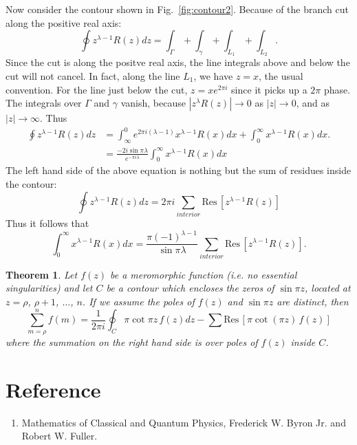 \documentclass[11pt, letterpaper]{article}
\newtheorem{thm}{Theorem}
\begin{document}
Now consider the contour shown in Fig.~\ref{fig:contour2}. Because of the branch cut along the positive real axis:
\begin{equation}
	\oint z^{\lambda-1}R(z)dz = \int_\Gamma + \int_\gamma + \int_{L_1} + \int_{L_2}.
\end{equation}
Since the cut is along the positve real axis, the line integrals above and below the cut will not cancel. In fact, 
along the line $L_1$, we have $z=x$, the usual convention. For the line just below the cut, $z = x e^{2\pi i}$
since it picks up a $2\pi$ phase. The integrals over $\Gamma$ and $\gamma$ vanish, because
$|z^\lambda R(z)|\rightarrow 0$ as $|z|\rightarrow 0$, and as $|z|\rightarrow \infty$. Thus
\begin{align}
	\oint z^{\lambda-1}R(z)dz 
		&= \int_\infty^0 e^{2\pi i (\lambda-1)}x^{\lambda-1}R(x)dx + \int_0^\infty x^{\lambda-1}R(x)dx. \nonumber\\
		&= \frac{-2i\sin\pi\lambda}{e^{-\pi i\lambda}}\int_0^\infty x^{\lambda-1}R(x)dx
\end{align}
The left hand side of the above equation is nothing but the sum of residues inside the contour:
\begin{equation}
	\oint z^{\lambda-1} R(z)dz = 2\pi i\sum_{interior} \mbox{Res}\,\left[z^{\lambda-1}R(z)\right]
\end{equation}
Thus it follows that
\begin{equation}
	\int_0^\infty x^{\lambda-1}R(x)dx = \frac{\pi(-1)^{\lambda-1}}{\sin\pi\lambda}
				\sum_{interior} \mbox{Res}\,\left[z^{\lambda-1}R(z)\right].
\end{equation}

\begin{thm}
Let $f(z)$ be a meromorphic function (i.e. no essential singularities) and let $C$ be a contour which encloses
the zeros of $\sin\pi z$, located at $z=\rho$, $\rho+1$, $\ldots$, $n$. If we assume the poles of $f(z)$ and
$\sin\pi z$ are distinct, then
\begin{equation}
	\sum_{m=\rho}^n f(m) = \frac{1}{2\pi i}\oint_C \pi\cot\pi z\,f(z)dz 
			- \sum\mbox{Res}\,\left[\pi\cot(\pi z)\,f(z)\right]
\end{equation}
where the summation on the right hand side is over poles of $f(z)$ inside $C$.
\end{thm}


\section{Reference}
\begin{enumerate}
	\item Mathematics of Classical and Quantum Physics, Frederick W. Byron Jr. and Robert W. Fuller.
\end{enumerate}
\end{document}
